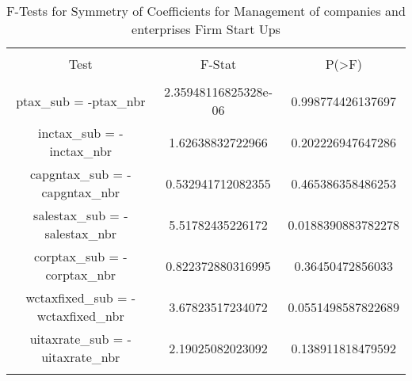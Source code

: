 
\begin{table}[!htbp] \centering 
  \caption{F-Tests for Symmetry of Coefficients for Management of companies and enterprises Firm Start Ups} 
  \label{} 
\begin{tabular}{@{\extracolsep{5pt}} ccc} 
\\[-1.8ex]\hline 
\hline \\[-1.8ex] 
Test & F-Stat & P(\textgreater F) \\ 
\hline \\[-1.8ex] 
ptax\_sub = -ptax\_nbr & 2.35948116825328e-06 & 0.998774426137697 \\ 
inctax\_sub = -inctax\_nbr & 1.62638832722966 & 0.202226947647286 \\ 
capgntax\_sub = -capgntax\_nbr & 0.532941712082355 & 0.465386358486253 \\ 
salestax\_sub = -salestax\_nbr & 5.51782435226172 & 0.0188390883782278 \\ 
corptax\_sub = -corptax\_nbr & 0.822372880316995 & 0.36450472856033 \\ 
wctaxfixed\_sub = -wctaxfixed\_nbr & 3.67823517234072 & 0.0551498587822689 \\ 
uitaxrate\_sub = -uitaxrate\_nbr & 2.19025082023092 & 0.138911818479592 \\ 
\hline \\[-1.8ex] 
\end{tabular} 
\end{table} 
